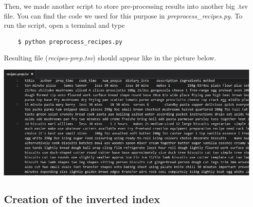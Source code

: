 Then, we made another script to store pre-processing results into another big .tsv file. You can find the code we used for this purpose in \textit{preprocess\_recipes.py}. To run the script, open a terminal and type
\begin{lstlisting}
	$ python preprocess_recipes.py
\end{lstlisting}
Resulting file (\textit{recipes-prep.tsv}) should appear like in the picture below.
\begin{center}
	\vspace{5mm}
	\includegraphics[scale=0.5]{img/recipes-prep-tsv.jpg}
\end{center}


\subsection{Creation of the inverted index}

